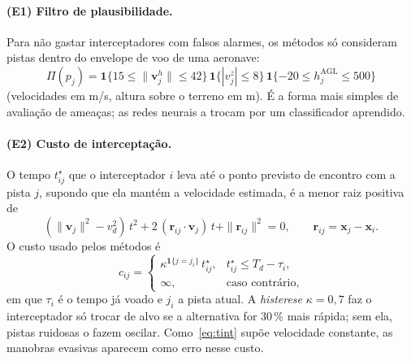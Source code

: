 \documentclass[11pt,a4paper]{article}
\begin{document}
\paragraph{(E1) Filtro de plausibilidade.} Para não gastar interceptadores com falsos alarmes, os métodos só consideram
pistas dentro do envelope de voo de uma aeronave:
\begin{equation}
  \Pi(p_j)=\mathbf{1}\{15\le\|\bm{v}_{j}^{h}\|\le42\}\,\mathbf{1}\{|v_{j}^{z}|\le8\}\,\mathbf{1}\{-20\le h_j^{\mathrm{AGL}}\le500\}
  \label{eq:plaus}
\end{equation}
(velocidades em m/s, altura sobre o terreno em m). É a forma mais simples de avaliação de ameaças; as redes neurais a
trocam por um classificador aprendido.

\paragraph{(E2) Custo de interceptação.} O tempo $t^\star_{ij}$ que o interceptador $i$ leva até o ponto previsto de
encontro com a pista $j$, supondo que ela mantém a velocidade estimada, é a menor raiz positiva de
\begin{equation}
  (\|\bm{v}_j\|^2-v_d^2)\,t^2+2\,(\bm{r}_{ij}\!\cdot\!\bm{v}_j)\,t+\|\bm{r}_{ij}\|^2=0,\qquad \bm{r}_{ij}=\bm{x}_j-\bm{x}_i .
  \label{eq:tint}
\end{equation}
O custo usado pelos métodos é
\begin{equation}
  c_{ij} = \begin{cases} \kappa^{\mathbf{1}\{j=j_i\}}\,t^\star_{ij}, & t^\star_{ij}\le T_d-\tau_i,\\ \infty, & \text{caso contrário,}\end{cases}
  \label{eq:custo}
\end{equation}
em que $\tau_i$ é o tempo já voado e $j_i$ a pista atual. A \emph{histerese} $\kappa=0{,}7$ faz o interceptador só trocar
de alvo se a alternativa for 30\,\% mais rápida; sem ela, pistas ruidosas o fazem oscilar. Como~\eqref{eq:tint} supõe
velocidade constante, as manobras evasivas aparecem como erro nesse custo.
\end{document}
